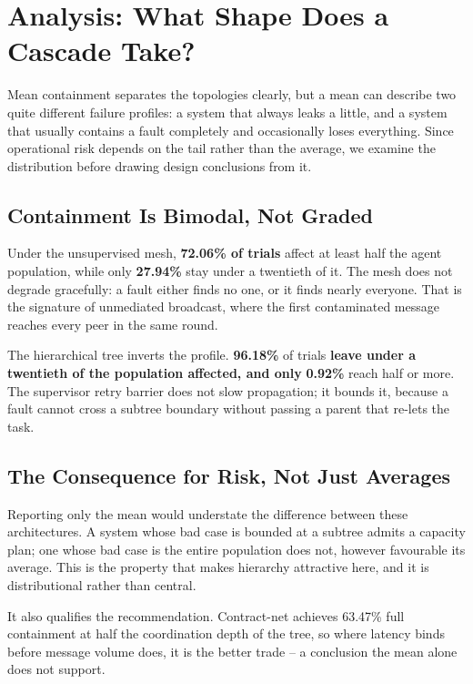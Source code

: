 \documentclass[10pt,journal,compsoc,twocolumn]{IEEEtran}
\begin{document}
\section{Analysis: What Shape Does a Cascade Take?}


Mean containment separates the topologies clearly, but a mean can describe two
quite different failure profiles: a system that always leaks a little, and a system
that usually contains a fault completely and occasionally loses everything. Since
operational risk depends on the tail rather than the average, we examine the
distribution before drawing design conclusions from it.


\subsection{Containment Is Bimodal, Not Graded}


Under the unsupervised mesh, \textbf{72.06\% of trials}
affect at least half the agent population, while only
\textbf{27.94\%} stay under a twentieth of it. The mesh
does not degrade gracefully: a fault either finds no one, or it finds nearly
everyone. That is the signature of unmediated broadcast, where the first
contaminated message reaches every peer in the same round.

The hierarchical tree inverts the profile. \textbf{96.18\%}
of trials\textbf{ leave under a twentieth of the population affected, and only}
\textbf{0.92\%} reach half or more. The supervisor
retry barrier does not slow propagation; it bounds it, because a fault cannot cross
a subtree boundary without passing a parent that re-lets the task.


\subsection{The Consequence for Risk, Not Just Averages}


Reporting only the mean would understate the difference between these
architectures. A system whose bad case is bounded at a subtree admits a capacity
plan; one whose bad case is the entire population does not, however favourable its
average. This is the property that makes hierarchy attractive here, and it is
distributional rather than central.

It also qualifies the recommendation. Contract-net achieves
63.47\% full containment at half the
coordination depth of the tree, so where latency binds before message volume does,
it is the better trade -- a conclusion the mean alone does not support.
\end{document}
